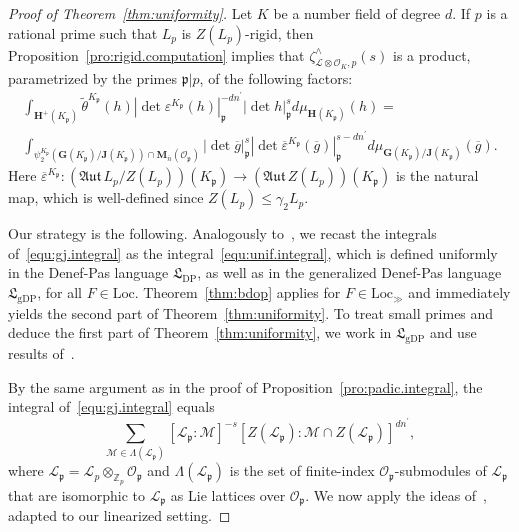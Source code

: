 \documentclass[11pt,a4paper]{amsart}
\theoremstyle{plain}
\theoremstyle{remark}
\newcommand{\Z}{\mathbb{Z}}
\newcommand{\tensor}{\otimes}
\newcommand{\p}{\mathfrak{p}}
\newcommand{\dimL}{n}
\newcommand{\overdim}{\overline{n}}
\def \aAut {\mathfrak{Aut} \,}
\def \p {\ensuremath{\mathfrak{p}}}
\begin{document}
\begin{proof}[Proof of Theorem~\ref{thm:uniformity}]
Let $K$ be a number field of degree $d$.  
If $p$ is a rational prime such that $L_p$ is $Z(L_p)$-rigid, then Proposition~\ref{pro:rigid.computation} implies that $ \zeta^\wedge_{\mathcal{L} \tensor \mathcal{O}_K, p}(s)$ is a product, parametrized by the primes $\p | p$, of the following factors:
\begin{multline} \label{equ:gj.integral}
\int_{\mathbf{H}^+(K_\p)} \widetilde{\theta}^{K_\p}(h) |\det \varepsilon^{K_\p}(h)|_{\p}^{-d \dimL^\prime} |\det h|^s_{\p} d \mu_{\mathbf{H}(K_\p)}(h) = \\ 
 \int_{\psi_2^{K_\p}(\mathbf{G}(K_\p)/\mathbf{J}(K_\p)) \cap \mathbf{M}_{\overdim}(\mathcal{O}_{\p})} | \det \overline{g} |^s_{\p} |\det \overline{\varepsilon}^{K_\p} (\overline{g}) |^{s-d \dimL^\prime}_{\p} d \mu_{\mathbf{G}(K_\p) / \mathbf{J}(K_\p)} (\overline{g}).
 \end{multline}
Here $\overline{\varepsilon}^{K_\p} : (\aAut L_p / Z(L_p))(K_\p) \to (\aAut Z(L_p))(K_\p)$ is the natural map, which is well-defined since $Z(L_p) \leq \gamma_2 L_p$.

Our strategy is the following.  Analogously to~\cite[\S2]{GSS/88}, we recast the integrals of~\eqref{equ:gj.integral} as the integral~\eqref{equ:unif.integral}, which is defined uniformly in the Denef-Pas language $\mathfrak{L}_{\mathrm{DP}}$, as well as in the generalized Denef-Pas language $\mathfrak{L}_{\mathrm{gDP}}$, for all $F \in \mathrm{Loc}$.  Theorem~\ref{thm:bdop} applies for $F \in \mathrm{Loc}_\gg$ and immediately yields the second part of Theorem~\ref{thm:uniformity}.  To treat small primes and deduce the first part of Theorem~\ref{thm:uniformity}, we work in $\mathfrak{L}_{\mathrm{gDP}}$ and use results of~\cite{CluckersHalupczok/18}.

By the same argument as in the proof of Proposition~\ref{pro:padic.integral}, the integral of~\eqref{equ:gj.integral} equals
\begin{equation} \label{equ:reinterpretation}
\sum_{\mathcal{M} \in \Lambda(\mathcal{L}_\p)} [\mathcal{L}_\p : \mathcal{M}]^{-s} [Z(\mathcal{L}_\p) : \mathcal{M} \cap Z(\mathcal{L}_\p)]^{d \dimL^\prime},
\end{equation}
where $\mathcal{L}_\p = \mathcal{L}_p \otimes_{\Z_p} \mathcal{O}_\p$ and $\Lambda(\mathcal{L}_\p)$ is the set of finite-index $\mathcal{O}_\p$-submodules of $\mathcal{L}_\p$ that are isomorphic to $\mathcal{L}_\p$ as Lie lattices over $\mathcal{O}_\p$.  We now apply the ideas of~\cite[\S2]{GSS/88}, adapted to our linearized setting.  


\end{proof}
\end{document}
